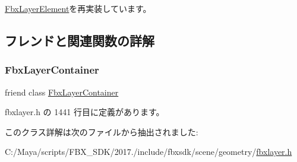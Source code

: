 \hyperlink{class_fbx_layer_element_ab4740c4774c0600f91515fb2c022f0ef}{Fbx\+Layer\+Element}を再実装しています。



\subsection{フレンドと関連関数の詳解}
\mbox{\label{class_fbx_layer_element_material_a791d2046ce60bf6f5fb85d9dc6242f2e}} 
\subsubsection{\texorpdfstring{Fbx\+Layer\+Container}{FbxLayerContainer}}
{\footnotesize\ttfamily friend class \hyperlink{class_fbx_layer_container}{Fbx\+Layer\+Container}\hspace{0.3cm}{\ttfamily [friend]}}



 fbxlayer.\+h の 1441 行目に定義があります。



このクラス詳解は次のファイルから抽出されました\+:\begin{DoxyCompactItemize}
\item 
C\+:/\+Maya/scripts/\+F\+B\+X\+\_\+\+S\+D\+K/2017./include/fbxsdk/scene/geometry/\hyperlink{fbxlayer_8h}{fbxlayer.\+h}\end{DoxyCompactItemize}

